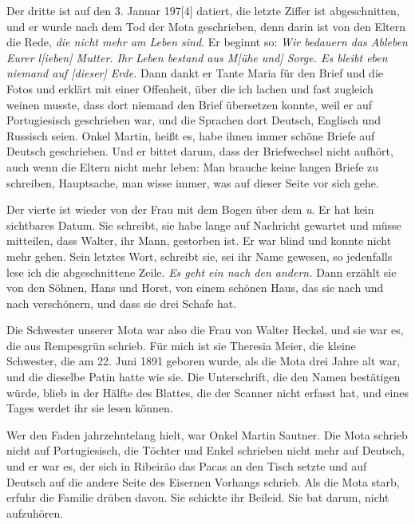 \documentclass[
  ngerman,
  11pt,
  openany]{book}
\begin{document}
Der dritte ist auf den 3. Januar 197{[}4{]} datiert, die letzte Ziffer
ist abgeschnitten, und er wurde nach dem Tod der Mota geschrieben, denn
darin ist von den Eltern die Rede, \emph{die nicht mehr am Leben sind}.
Er beginnt so: \emph{Wir bedauern das Ableben Eurer l{[}ieben{]} Mutter.
Ihr Leben bestand aus M{[}ühe und{]} Sorge. Es bleibt eben niemand auf
{[}dieser{]} Erde.} Dann dankt er Tante Maria für den Brief und die
Fotos und erklärt mit einer Offenheit, über die ich lachen und fast
zugleich weinen musste, dass dort niemand den Brief übersetzen konnte,
weil er auf Portugiesisch geschrieben war, und die Sprachen dort
Deutsch, Englisch und Russisch seien. Onkel Martin, heißt es, habe ihnen
immer schöne Briefe auf Deutsch geschrieben. Und er bittet darum, dass
der Briefwechsel nicht aufhört, auch wenn die Eltern nicht mehr leben:
Man brauche keine langen Briefe zu schreiben, Hauptsache, man wisse
immer, was auf dieser Seite vor sich gehe.

Der vierte ist wieder von der Frau mit dem Bogen über dem \emph{u}. Er
hat kein sichtbares Datum. Sie schreibt, sie habe lange auf Nachricht
gewartet und müsse mitteilen, dass Walter, ihr Mann, gestorben ist. Er
war blind und konnte nicht mehr gehen. Sein letztes Wort, schreibt sie,
sei ihr Name gewesen, so jedenfalls lese ich die abgeschnittene Zeile.
\emph{Es geht ein nach den andern.} Dann erzählt sie von den Söhnen,
Hans und Horst, von einem schönen Haus, das sie nach und nach
verschönern, und dass sie drei Schafe hat.

Die Schwester unserer Mota war also die Frau von Walter Heckel, und sie
war es, die aus Rempesgrün schrieb. Für mich ist sie Theresia Meier, die
kleine Schwester, die am 22. Juni 1891 geboren wurde, als die Mota drei
Jahre alt war, und die dieselbe Patin hatte wie sie. Die Unterschrift,
die den Namen bestätigen würde, blieb in der Hälfte des Blattes, die der
Scanner nicht erfasst hat, und eines Tages werdet ihr sie lesen können.

Wer den Faden jahrzehntelang hielt, war Onkel Martin Sautner. Die Mota
schrieb nicht auf Portugiesisch, die Töchter und Enkel schrieben nicht
mehr auf Deutsch, und er war es, der sich in Ribeirão das Pacas an den
Tisch setzte und auf Deutsch auf die andere Seite des Eisernen Vorhangs
schrieb. Als die Mota starb, erfuhr die Familie drüben davon. Sie
schickte ihr Beileid. Sie bat darum, nicht aufzuhören.
\end{document}
